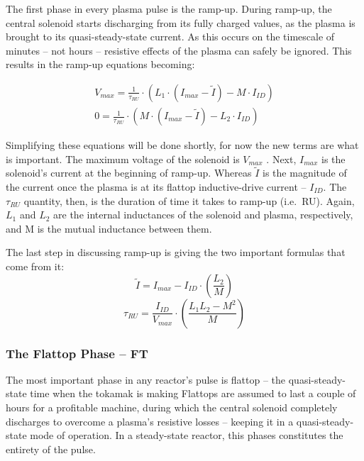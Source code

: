 The first phase in every plasma pulse is the ramp-up. During ramp-up, the central solenoid starts discharging from its fully charged values, as the plasma is brought to its quasi-steady-state current. As this occurs on the timescale of minutes -- not hours -- resistive effects of the plasma can safely be ignored. This results in the ramp-up equations becoming:

\begin{align}
	V_{max} = \frac{1}{\tau_{RU}} \cdot \left( L_1 \cdot ( I_{max} - \tilde I ) - M \cdot I_{ID} \right) \\
	0 = \frac{1}{\tau_{RU}} \cdot \left( M \cdot ( I_{max} - \tilde I ) - L_2 \cdot I_{ID} \right)
\end{align}

Simplifying these equations will be done shortly, for now the new terms are what is important. The maximum voltage of the solenoid is $V_{max}$ . Next, $I_{max}$ is the solenoid's current at the beginning of ramp-up. Whereas $\tilde I$ is the magnitude of the current once the plasma is at its flattop inductive-drive current -- $I_{ID}$. The $\tau_{RU}$ quantity, then, is the duration of time it takes to ramp-up (i.e.\ RU). Again, $L_1$ and $L_2$ are the  internal inductances of the solenoid and plasma, respectively, and M is the mutual inductance between them.

The last step in discussing ramp-up is giving the two important formulas that come from it:
\begin{equation}
	\label{eq:itilde}
	\tilde I = I_{max} - I_{ID} \cdot \left( \frac{L_2}{M} \right)
\end{equation}
\begin{equation}
	\label{eq:tauru}
	\tau_{RU} = \frac{I_{ID}}{V_{max}} \cdot \left( \frac{ L_1 L_2 - M^2 }{ M } \right)
\end{equation}

\subsubsection{The Flattop Phase -- FT}

The most important phase in any reactor's pulse is flattop -- the quasi-steady-state time when the tokamak is making  Flattops are assumed to last a couple of hours for a profitable machine, during which the central solenoid completely discharges to overcome a plasma's resistive losses -- keeping it in a quasi-steady-state mode of operation. In a steady-state reactor, this phases constitutes the entirety of the pulse.

